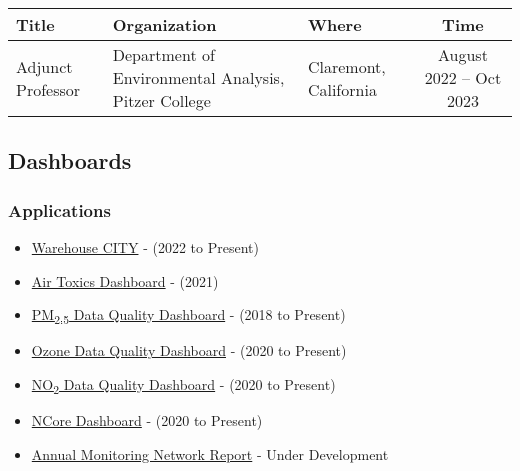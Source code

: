 \documentclass[
]{article}
\providecommand{\tightlist}{%
  \setlength{\itemsep}{0pt}\setlength{\parskip}{0pt}}
\begin{document}
\begin{longtable}{lllc}
\toprule
Title & Organization & Where & Time \\ 
\midrule
Adjunct Professor & Department of Environmental Analysis, Pitzer College & Claremont, California & August 2022 -- Oct 2023 \\ 
\bottomrule
\end{longtable}

\hypertarget{dashboards}{%
\subsection{Dashboards}\label{dashboards}}

\hypertarget{applications}{%
\subsubsection{Applications}\label{applications}}

\begin{itemize}
\tightlist
\item
  \href{https://radicalresearch.shinyapps.io/WarehouseCITY/}{Warehouse
  CITY} - (2022 to Present)
\item
  \href{https://radicalresearch.shinyapps.io/ToxicsDashboard/}{Air
  Toxics Dashboard} - (2021)
\item
  \href{https://sti-r-shiny.shinyapps.io/QVA_Dashboard/}{PM\textsubscript{2.5}
  Data Quality Dashboard} - (2018 to Present)
\item
  \href{https://sti-r-shiny.shinyapps.io/ozone_Dashboard/}{Ozone Data
  Quality Dashboard} - (2020 to Present)
\item
  \href{https://sti-r-shiny.shinyapps.io/QVA_Dashboard/}{NO\textsubscript{2}
  Data Quality Dashboard} - (2020 to Present)
\item
  \href{https://sti-r-shiny.shinyapps.io/NCORE_Dashboard/}{NCore
  Dashboard} - (2020 to Present)
\item
  \href{https://radicalresearch.shinyapps.io/NetworkAssessment/}{Annual
  Monitoring Network Report} - Under Development
\end{itemize}
\end{document}
